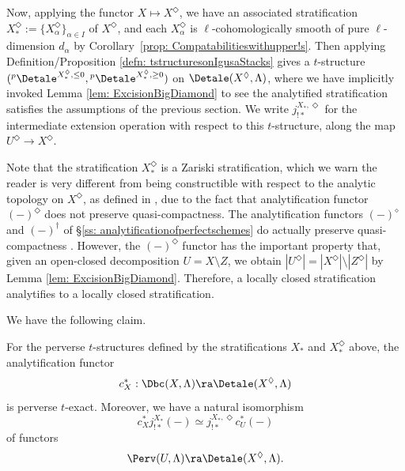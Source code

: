 \documentclass[letterpaper,11pt]{amsart}
\begin{document}
Now, applying the functor $X\mapsto X^\Diamond$, we have an associated stratification $X_\ast^{\Diamond} := \{X^{\Diamond}_{\alpha}\}_{\alpha\in I}$ of $X^{\Diamond}$, and each $X_\alpha^\Diamond$ is $\ell$-cohomologically smooth of pure $\ell$-dimension $d_\alpha$ by Corollary~\ref{prop: Compatabilitieswithupper!s}. Then applying Definition/Proposition \ref{defn: tstructuresonIgusaStacks} gives a $t$-structure $(\phantom{}^{p}\Detale^{X^\Diamond_\ast,\leq 0},\phantom{}^{p}\Detale^{X^\Diamond_\ast,\geq 0})$ on $\Detale(X^{\Diamond},\Lambda)$, where we have implicitly invoked Lemma \ref{lem: ExcisionBigDiamond} to see the analytified stratification satisfies the assumptions of the previous section. We write $j_{!*}^{X_\ast,\Diamond}$ for the intermediate extension operation with respect to this $t$-structure, along the map $U^\Diamond\to X^\Diamond$. 
\begin{remark}{\label{rem: stratificationsanalytify}}
Note that the stratification $X_\ast^{\Diamond}$ is a Zariski stratification, which we warn the reader is very different from being constructible with respect to the analytic topology on $X^{\Diamond}$, as defined in \cite[Section~20]{Ecod}, due to the fact that analytification functor $(-)^{\Diamond}$ does not preserve quasi-compactness. The analytification functors $(-)^{\diamond}$ and $(-)^{\dagger}$ of \S \ref{ss: analytificationofperfectschemes} do actually preserve quasi-compactness \cite[Lemma~4.4.12]{GHILZIsocComparison}. However, the $(-)^{\Diamond}$ functor has the important property that, given an open-closed decomposition $U=X \setminus Z$, we obtain $|U^{\Diamond}| = |X^{\Diamond}| \setminus |Z^{\Diamond}|$ by Lemma \ref{lem: ExcisionBigDiamond}. Therefore, a locally closed stratification analytifies to a locally closed stratification. 
\end{remark}

We have the following claim. 
\begin{lemma}{\label{lemma: intermediateextensioncompatiblewithanalytification}}
For the perverse $t$-structures defined by the stratifications $X_\ast$ and $X_\ast^\Diamond$ above, the analytification functor 
\[ c_{X}^\ast: \Dbc(X,\Lambda) \ra \Detale(X^\Diamond,\Lambda) \]
is perverse $t$-exact. Moreover, we have a natural isomorphism  
\[ c_{X}^{*}j_{!*}^{X_{*}}(-) \simeq j_{!*}^{X_{*},\Diamond}c_{U}^{*}(-) \]
of functors 
\[ \Perv(U,\Lambda) \ra \Detale(X^\Diamond,\Lambda). \]
\end{lemma}
\end{document}
